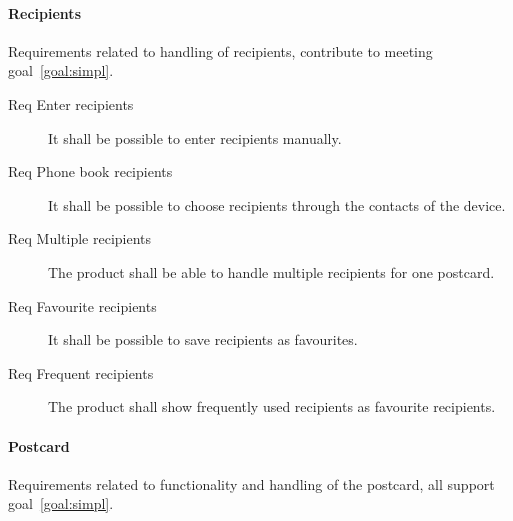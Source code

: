 \documentclass[10pt,a4paper]{article}
\begin{document}
\paragraph{Recipients}
Requirements related to handling of recipients, contribute to meeting goal~\ref{goal:simpl}.

\begin{description}
	\item [Req  Enter recipients] It shall be possible to enter recipients manually.
	\item [Req  Phone book recipients] It shall be possible to choose recipients through the contacts of the device.
	\item [Req  Multiple recipients] The product shall be able to handle multiple recipients for one postcard.
	\item [Req  Favourite recipients] It shall be possible to save recipients as favourites.
	\item [Req  Frequent recipients] The product shall show frequently used recipients as favourite recipients.
\end{description}

\paragraph{Postcard}
Requirements related to functionality and handling of the postcard, all support goal~\ref{goal:simpl}.
\end{document}
